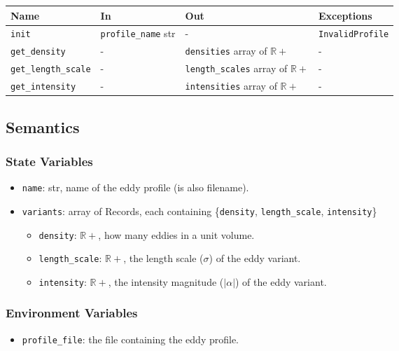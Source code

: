 \documentclass[12pt, titlepage]{article}
\begin{document}
\begin{center}
\begin{tabular}{p{3.2cm} p{3.5cm} p{5cm} p{3cm}}
\hline
\textbf{Name} & \textbf{In} & \textbf{Out} & \textbf{Exceptions} \\
\hline
\texttt{init} & \texttt{profile\_name} str & - & \texttt{InvalidProfile} \\
\texttt{get\_density}& - & \texttt{densities} array of $\mathbb{R+}$ & - \\
\texttt{get\_length\_scale}& - & \texttt{length\_scales} array of $\mathbb{R+}$ & - \\
\texttt{get\_intensity}& - & \texttt{intensities} array of $\mathbb{R+}$ & - \\
\hline
\end{tabular}
\end{center}

\subsection{Semantics}

\subsubsection{State Variables}
\begin{itemize}
  \item \texttt{name}: str, name of the eddy profile (is also filename).
  \item \texttt{variants}: array of Records, each containing \{\texttt{density}, \texttt{length\_scale}, \texttt{intensity}\}
  \begin{itemize}
    \item \texttt{density}: $\mathbb{R+}$, how many eddies in a unit volume.
    \item \texttt{length\_scale}: $\mathbb{R+}$, the length scale ($\sigma$) of the eddy variant.
    \item \texttt{intensity}: $\mathbb{R+}$, the intensity magnitude ($|\alpha|$) of the eddy variant.
  \end{itemize}
  
\end{itemize}

\subsubsection{Environment Variables}
\begin{itemize}
  \item \texttt{profile\_file}: the file containing the eddy profile.
\end{itemize}
\end{document}

